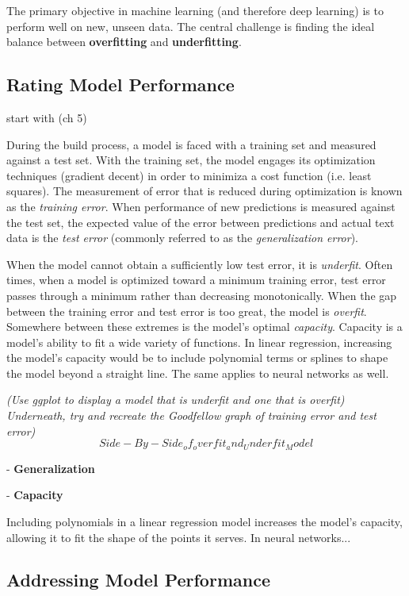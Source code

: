 The primary objective in machine learning (and therefore deep learning) is to perform well on new, unseen data.  The central challenge is finding the ideal balance between \textbf{overfitting} and \textbf{underfitting}.

\subsection{Rating Model Performance} start with \cite{Goodfellow-et-al-2016} (ch 5)

During the build process, a model is faced with a training set and measured against a test set.  With the training set, the model engages its optimization techniques (gradient decent) in order to minimiza a cost function (i.e. least squares).  The measurement of error that is reduced during optimization is known as the \textit{training error}.  When performance of new predictions is measured against the test set, the expected value of the error between predictions and actual text data is the \textit{test error} (commonly referred to as the \textit{generalization error}). \cite{Goodfellow-et-al-2016}

 When the model cannot obtain a sufficiently low test error, it is \textit{underfit}.  Often times, when a model is optimized toward a minimum training error, test error passes through a minimum rather than decreasing monotonically. \cite{mackay1992bayesian}  When the gap between the training error and test error is too great, the model is \textit{overfit}.  Somewhere between these extremes is the model's optimal \textit{capacity}.  Capacity is a model's ability to fit a wide variety of functions.  In linear regression, increasing the model's capacity would be to include polynomial terms or splines to shape the model beyond a straight line.  The same applies to neural networks as well.

\textit{(Use ggplot to display a model that is underfit and one that is overfit)  Underneath, try and recreate the Goodfellow graph of training error and test error)}
$$
Side-By-Side_of_overfit_and_Underfit_Model
$$

- \textbf{Generalization}


- \textbf{Capacity} 

Including polynomials in a linear regression model increases the model's capacity, allowing it to fit the shape of the points it serves.  In neural networks...



\subsection{Addressing Model Performance}

